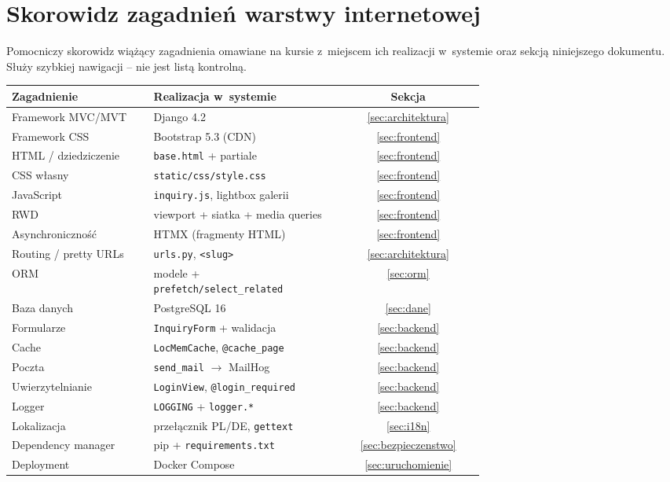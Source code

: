 \documentclass[12pt,a4paper]{article}
\begin{document}
\newpage
\appendix
\section{Skorowidz zagadnień warstwy internetowej}
\label{sec:skorowidz}

Pomocniczy skorowidz wiążący zagadnienia omawiane na kursie z~miejscem ich realizacji
w~systemie oraz sekcją niniejszego dokumentu. Służy szybkiej nawigacji -- nie jest
listą kontrolną.

\begin{longtable}{p{0.30\linewidth}p{0.40\linewidth}c}
\toprule
\textbf{Zagadnienie} & \textbf{Realizacja w~systemie} & \textbf{Sekcja} \\
\midrule
\endhead
Framework MVC/MVT      & Django 4.2                            & \ref{sec:architektura} \\
Framework CSS          & Bootstrap 5.3 (CDN)                   & \ref{sec:frontend} \\
HTML / dziedziczenie   & \texttt{base.html} + partiale         & \ref{sec:frontend} \\
CSS własny             & \texttt{static/css/style.css}         & \ref{sec:frontend} \\
JavaScript             & \texttt{inquiry.js}, lightbox galerii & \ref{sec:frontend} \\
RWD                    & viewport + siatka + media queries     & \ref{sec:frontend} \\
Asynchroniczność       & HTMX (fragmenty HTML)                 & \ref{sec:frontend} \\
Routing / pretty URLs  & \texttt{urls.py}, \texttt{<slug>}     & \ref{sec:architektura} \\
ORM                    & modele + \texttt{prefetch/select\_related} & \ref{sec:orm} \\
Baza danych            & PostgreSQL 16                         & \ref{sec:dane} \\
Formularze             & \texttt{InquiryForm} + walidacja      & \ref{sec:backend} \\
Cache                  & \texttt{LocMemCache}, \texttt{@cache\_page} & \ref{sec:backend} \\
Poczta                 & \texttt{send\_mail} $\to$ MailHog     & \ref{sec:backend} \\
Uwierzytelnianie       & \texttt{LoginView}, \texttt{@login\_required} & \ref{sec:backend} \\
Logger                 & \texttt{LOGGING} + \texttt{logger.*}  & \ref{sec:backend} \\
Lokalizacja            & przełącznik PL/DE, \texttt{gettext}   & \ref{sec:i18n} \\
Dependency manager     & pip + \texttt{requirements.txt}       & \ref{sec:bezpieczenstwo} \\
Deployment             & Docker Compose                        & \ref{sec:uruchomienie} \\
\bottomrule
\end{longtable}
\end{document}
